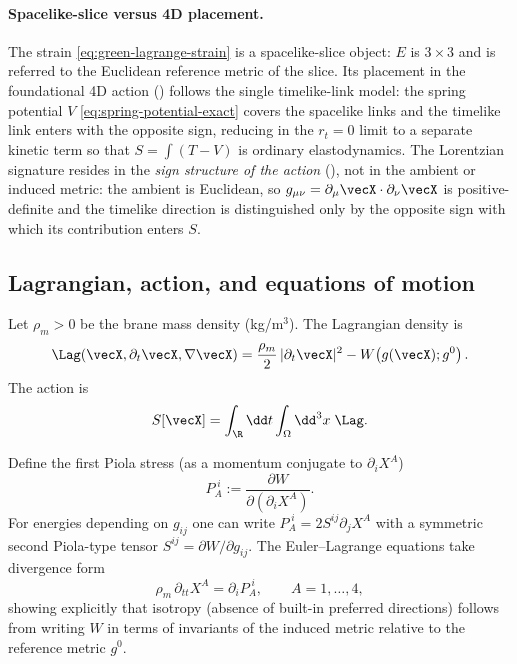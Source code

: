 \paragraph{Spacelike-slice versus 4D placement.}
The strain \eqref{eq:green-lagrange-strain} is a spacelike-slice object: $E$ is $3\times 3$
and is referred to the Euclidean reference metric of the slice.
Its placement in the foundational 4D action () follows the
single timelike-link model: the spring potential $V$ \eqref{eq:spring-potential-exact} covers
the spacelike links and the timelike link enters with the opposite sign, reducing in the
$r_t=0$ limit to a separate kinetic term so that $S=\int(T-V)$ is ordinary elastodynamics.
The Lorentzian signature resides in the \emph{sign structure of the action}
(), not in the ambient or induced metric: the ambient is
Euclidean, so $g_{\mu\nu}=\partial_\mu\vecX\cdot\partial_\nu\vecX$ is positive-definite and
the timelike direction is distinguished only by the opposite sign with which its contribution
enters $S$.

\subsection{Lagrangian, action, and equations of motion}

Let $\rho_m>0$ be the brane mass density (kg/m$^3$). The Lagrangian density is
\begin{equation}
  \Lag(\vecX,\partial_t\vecX,\nabla\vecX)
  =\frac{\rho_m}{2}\,|\partial_t\vecX|^2
  -W\!\left(g(\vecX);g^0\right).
  \label{eq:lagrangian-density}
\end{equation}
The action is
\begin{equation}
  S[\vecX] = \int_{\R}\dd t \int_{\Omega} \dd^3 x\;\Lag.
  \label{eq:action}
\end{equation}

Define the first Piola stress (as a momentum conjugate to $\partial_i X^A$)
\begin{equation}
  P_A^{\;i} := \frac{\partial W}{\partial(\partial_i X^A)}.
  \label{eq:piola-def}
\end{equation}
For energies depending on $g_{ij}$ one can write $P_A^{\;i}=2S^{ij}\partial_j X^A$ with a symmetric
second Piola-type tensor $S^{ij}=\partial W/\partial g_{ij}$.
The Euler--Lagrange equations take divergence form
\begin{equation}
  \rho_m\,\partial_{tt} X^A = \partial_i P_A^{\;i},
  \qquad A=1,\dots,4,
  \label{eq:eom}
\end{equation}
showing explicitly that isotropy (absence of built-in preferred directions) follows from writing
$W$ in terms of invariants of the induced metric relative to the reference metric $g^0$.

